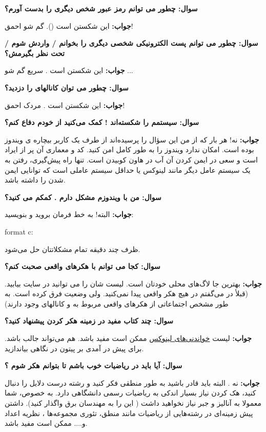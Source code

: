 \textbf{سوال:  چطور می توانم رمز عبور شخص دیگری را بدست آورم؟}

\textbf{جواب:}
 این شکستن است ().
 گم شو احمق!
 
\textbf{سوال:  چطور می توانم پست الکترونیکی شخصی دیگری را بخوانم / واردش شوم / تحت نظر بگیرمش؟}

\textbf{جواب:}
این شکستن است . سریع گم شو ...

\textbf{سوال:  چطور می توان کانالهای  را دزدید؟}

\textbf{جواب:}
 این شکستن است . مردک احمق!
 
\textbf{سوال:  سیستمم را شکسته‌اند ! کمک می‌کنید از خودم دفاع کنم؟}

\textbf{جواب:} 
نه! هر بار که از من این سؤال را پرسیده‌اند از طرف یک کاربر بیچاره ی ویندوز بوده است. امکان ندارد ویندوز را به طور کامل امن کنید. کد و معماری آن پر از ایراد است و سعی در ایمن کردن آن آب در هاون کوبیدن است. تنها راه پیش‌گیری، رفتن به یک سیستم عامل دیگر مانند لینوکس یا حداقل سیستم عاملی است که توانایی ایمن شدن را داشته باشد.

\textbf{سوال:  من با ویندوزم مشکل دارم . کمکم می کنید؟}

\textbf{جواب:}
 البته! به خط فرمان بروید و بنویسید:
\begin{frameng}
format c:
\end{frameng}

 ظرف چند دقیقه تمام مشکلاتتان حل می‌شود.
 
\textbf{سوال:  کجا می توانم با هکرهای واقعی صحبت کنم؟}

\textbf{جواب:}
 بهترین جا لاگ‌های محلی خودتان است. لیست شان را می توانید در سایت
بیابید.
(قبلأ در  می‌گفتم در 
 هیچ هکر واقعی پیدا نمی‌کنید. ولی وضعیت فرق کرده است. به طور مشخص اجتماعاتی از هکرهای واقعی مربوط به 
 و 
 کانالهای 
 وجود دارند)
 
\textbf{سوال:  چند کتاب مفید در زمینه هکر کردن پیشنهاد کنید؟}

\textbf{جواب:}
لیست
\href{http://en.tldp.org/HOWTO/Reading-List-HOWTO/index.html}{خواندنی‌های لینوکس}
ممکن است مفید باشد.
\href{http://www.catb.org/~esr/faqs/loginataka.html}{}
هم می‌تواند جالب باشد. برای پیش در آمدی بر پیتون در 
\href{http://www.python.org/doc/Intros.html}{}
نگاهی بیاندازید.

\textbf{سوال:  آیا باید در ریاضیات خوب باشم تا بتوانم هکر شوم ؟}

\textbf{جواب:} 
نه . البته باید قادر باشید به طور منطقی فکر کنید و رشته درست دلایل را دنبال کنید، هک کردن نیاز بسیار اندکی به ریاضیات رسمی دانشگاهی دارد. به خصوص، شما معمولا به آنالیز و جبر نیاز نخواهید داشت ( این را به مهندسان برق واگذار کنید). داشتن پیش زمینه‌ای در رشته‌هایی از ریاضیات مانند منطق، تئوری مجموعه‌ها ، نظریه اعداد و.... ممکن است مفید باشد.

